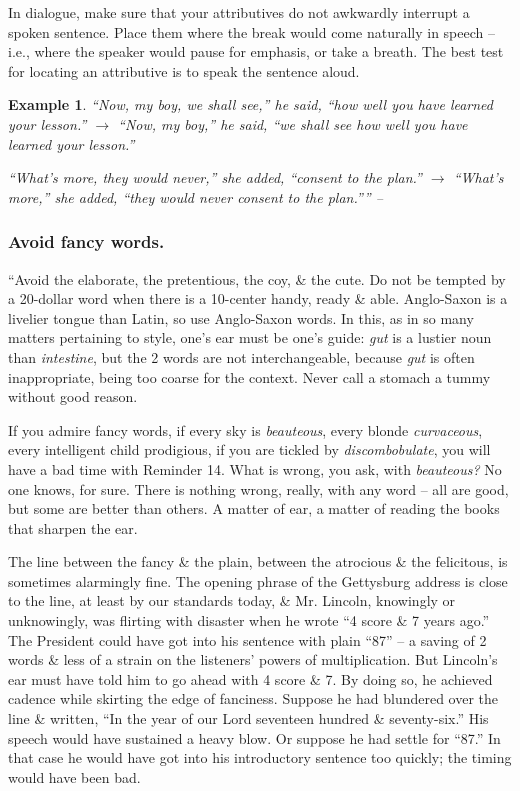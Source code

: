 \documentclass{article}
\newtheorem{example}{Example}
\begin{document}
In dialogue, make sure that your attributives do not awkwardly interrupt a spoken sentence. Place them where the break would come naturally in speech -- i.e., where the speaker would pause for emphasis, or take a breath. The best test for locating an attributive is to speak the sentence aloud.
\begin{example}
	``Now, my boy, we shall see,'' he said, ``how well you have learned your lesson.'' $\to$ ``Now, my boy,'' he said, ``we shall see how well you have learned your lesson.''
	
	``What's more, they would never,'' she added, ``consent to the plan.'' $\to$  ``What's more,'' she added, ``they would never consent to the plan.'''' -- \cite[p. 91]{Strunk_White_element_style}
\end{example}


\subsubsection{Avoid fancy words.}
``Avoid the elaborate, the pretentious, the coy, \& the cute. Do not be tempted by a 20-dollar word when there is a 10-center handy, ready \& able. Anglo-Saxon is a livelier tongue than Latin, so use Anglo-Saxon words. In this, as in so many matters pertaining to style, one's ear must be one's guide: {\it gut} is a lustier noun than {\it intestine}, but the 2 words are not interchangeable, because {\it gut} is often inappropriate, being too coarse for the context. Never call a stomach a tummy without good reason.

If you admire fancy words, if every sky is {\it beauteous}, every blonde {\it curvaceous}, every intelligent child prodigious, if you are tickled by {\it discombobulate}, you will have a bad time with Reminder 14. What is wrong, you ask, with {\it beauteous?} No one knows, for sure. There is nothing wrong, really, with any word -- all are good, but some are better than others. A matter of ear, a matter of reading the books that sharpen the ear.

The line between the fancy \& the plain, between the atrocious \& the felicitous, is sometimes alarmingly fine. The opening phrase of the Gettysburg address is close to the line, at least by our standards today, \& Mr. Lincoln, knowingly or unknowingly, was flirting with disaster when he wrote ``4 score \& 7 years ago.'' The President could have got into his sentence with plain ``87'' -- a saving of 2 words \& less of a strain on the listeners' powers of multiplication. But Lincoln's ear must have told him to go ahead with 4 score \& 7. By doing so, he achieved cadence while skirting the edge of fanciness. Suppose he had blundered over the line \& written, ``In the year of our Lord seventeen hundred \& seventy-six.'' His speech would have sustained a heavy blow. Or suppose he had settle for ``87.'' In that case he would have got into his introductory sentence too quickly; the timing would have been bad.
\end{document}
